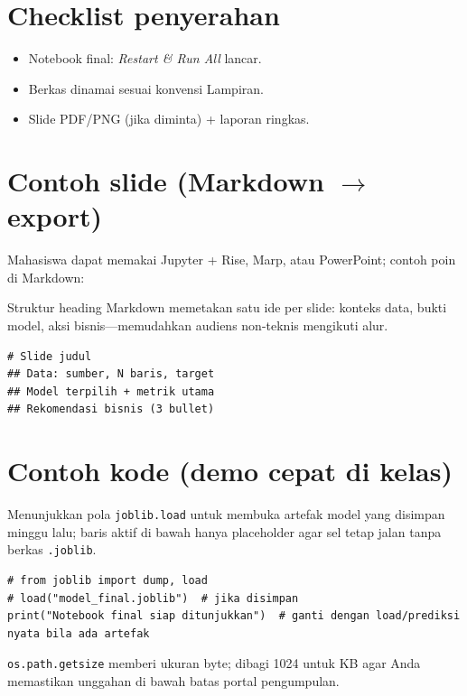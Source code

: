 \documentclass[../main.tex]{subfiles}
\begin{document}
\section{Checklist penyerahan}

\begin{itemize}[leftmargin=*]
  \item Notebook final: \textit{Restart \& Run All} lancar.
  \item Berkas dinamai sesuai konvensi Lampiran.
  \item Slide PDF/PNG (jika diminta) + laporan ringkas.
\end{itemize}



\section{\texorpdfstring{Contoh slide (Markdown $\rightarrow$ export)}{Contoh slide Markdown ke export}}

Mahasiswa dapat memakai Jupyter + Rise, Marp, atau PowerPoint; contoh poin di Markdown:

\MulaiPenjelasanKode Struktur heading Markdown memetakan satu ide per slide: konteks data, bukti model, aksi bisnis---memudahkan audiens non-teknis mengikuti alur. \SelesaiPenjelasanKode

\begin{verbatim}
# Slide judul
## Data: sumber, N baris, target
## Model terpilih + metrik utama
## Rekomendasi bisnis (3 bullet)
\end{verbatim}

\section{Contoh kode (demo cepat di kelas)}

\MulaiPenjelasanKode Menunjukkan pola \texttt{joblib.load} untuk membuka artefak model yang disimpan minggu lalu; baris aktif di bawah hanya placeholder agar sel tetap jalan tanpa berkas \texttt{.joblib}. \SelesaiPenjelasanKode

\begin{lstlisting}[caption=Muat ulang model/figur final]
# from joblib import dump, load
# load("model_final.joblib")  # jika disimpan
print("Notebook final siap ditunjukkan")  # ganti dengan load/prediksi nyata bila ada artefak
\end{lstlisting}

\MulaiPenjelasanKode \texttt{os.path.getsize} memberi ukuran byte; dibagi 1024 untuk KB agar Anda memastikan unggahan di bawah batas portal pengumpulan. \SelesaiPenjelasanKode
\end{document}
